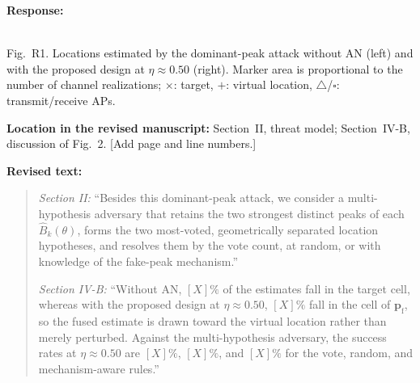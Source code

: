 \documentclass[a4paper,12pt]{article}
\newenvironment{response}{\par\textbf{Response:}\par}{\par}
\newcommand{\revisionlocation}[1]{\par\textbf{Location in the revised manuscript:} #1\par}
\newenvironment{revisedtext}{%
  \par\textbf{Revised text:}\begin{quote}\color{red}
}{\end{quote}}
\begin{document}
\begin{response}
\begin{center}
\\[0.5em]
\small Fig.~R1. Locations estimated by the dominant-peak attack without AN
(left) and with the proposed design at $\eta\approx0.50$ (right). Marker
area is proportional to the number of channel realizations; $\times$:
target, $+$: virtual location, $\triangle$/$\square$: transmit/receive APs.
\end{center}
\end{response}
\revisionlocation{Section~II, threat model; Section~IV-B, discussion of
Fig.~2. [Add page and line numbers.]}
\begin{revisedtext}
\textit{Section II:} ``Besides this dominant-peak attack, we consider a
multi-hypothesis adversary that retains the two strongest distinct peaks of
each $\widehat{B}_k(\theta)$, forms the two most-voted, geometrically
separated location hypotheses, and resolves them by the vote count, at
random, or with knowledge of the fake-peak mechanism.''

\textit{Section IV-B:} ``Without AN, $[X]\%$ of the estimates fall in the
target cell, whereas with the proposed design at $\eta\approx0.50$, $[X]\%$
fall in the cell of $\mathbf{p}_{\mathrm{f}}$, so the fused estimate is
drawn toward the virtual location rather than merely perturbed. Against the
multi-hypothesis adversary, the success rates at $\eta\approx0.50$ are
$[X]\%$, $[X]\%$, and $[X]\%$ for the vote, random, and mechanism-aware
rules.''
\end{revisedtext}
\end{document}
